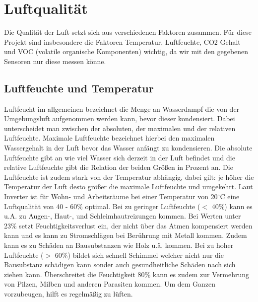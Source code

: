 \documentclass[]{article}
\begin{document}
	\section{Luftqualität}%
		Die Qualität der Luft setzt sich aus verschiedenen Faktoren zusammen. Für diese Projekt sind insbesondere die Faktoren Temperatur, Luftfeuchte, CO2 Gehalt und VOC (volatile organische Komponenten) wichtig, da wir mit den gegebenen Sensoren nur diese messen könne.
		\subsection{Luftfeuchte und Temperatur}
			Luftfeucht im allgemeinen bezeichnet die Menge an Wasserdampf die von der Umgebungsluft aufgenommen werden kann, bevor dieser kondensiert. Dabei unterscheidet man zwischen der absoluten, der maximalen und der relativen Luftfeuchte. Maximale Luftfeuchte bezeichnet hierbei den maximalen Wassergehalt in der Luft bevor das Wasser anfängt zu kondensieren. Die absolute Luftfeuchte gibt an wie viel Wasser sich derzeit in der Luft befindet und die relative Luftfeuchte gibt die Relation der beiden Größen in Prozent an. Die Luftfeuchte ist zudem stark von der Temperatur abhängig, dabei gilt: je höher die Temperatur der Luft desto größer die maximale Luftfeuchte und umgekehrt. Laut Inverter\cite{luftquali_inventer} ist für Wohn- und Arbeitsräume bei einer Temperatur von 20$^\circ$C eine Luftqualität von 40 - 60\% optimal. Bei zu geringer Luftfeuchte ($<$ 40\%) kann es u.A. zu Augen-, Haut-, und Schleimhautreizungen kommen. Bei Werten unter 23\% setzt Feuchtigkeitsverlust ein, der nicht über das Atmen kompensiert werden kann und es kann zu Stromschlägen bei Berührung mit Metall kommen. Zudem kann es zu Schäden an Bausubstanzen wie Holz u.ä. kommen. Bei zu hoher Luftfeuchte ($>$ 60\%) bildet sich schnell Schimmel welcher nicht nur die Bausubstanz schädigen kann sonder auch gesundheitliche Schäden nach sich ziehen kann. Überschreitet die Feuchtigkeit 80\% kann es zudem zur Vermehrung von Pilzen, Milben und anderen Parasiten kommen. Um dem Ganzen vorzubeugen, hilft es regelmäßig zu lüften.
\end{document}
